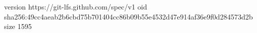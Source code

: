 version https://git-lfs.github.com/spec/v1
oid sha256:49cc4aeab2b6cbd75b701404cc86b09b55e4532d47e914af36e9f0d284573d2b
size 1595
